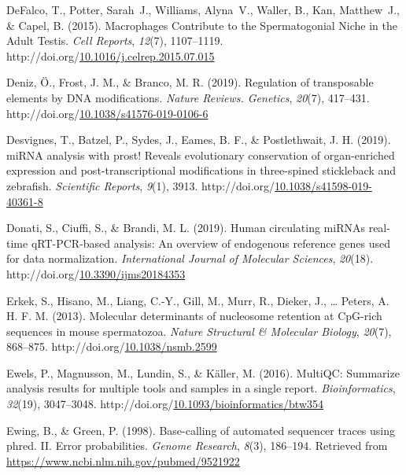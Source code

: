 \documentclass[12pt,twoside]{reedthesis}
\newlength{\cslhangindent}
\newenvironment{CSLReferences}[2] %
 {%
  \setlength{\parindent}{0pt}
  \ifodd #1 \everypar{\setlength{\hangindent}{\cslhangindent}}\ignorespaces\fi
  \ifnum #2 > 0
  \setlength{\parskip}{#2\baselineskip}
  \fi
 }%
 {}
\begin{document}
\begin{CSLReferences}{1}{0}
\leavevmode{}%
DeFalco, T., Potter, Sarah~J., Williams, Alyna~V., Waller, B., Kan, Matthew~J., \& Capel, B. (2015). Macrophages Contribute to the Spermatogonial Niche in the Adult Testis. \emph{Cell Reports}, \emph{12}(7), 1107--1119. http://doi.org/\href{https://doi.org/10.1016/j.celrep.2015.07.015}{10.1016/j.celrep.2015.07.015}

\leavevmode{}%
Deniz, Ö., Frost, J. M., \& Branco, M. R. (2019). Regulation of transposable elements by DNA modifications. \emph{Nature Reviews. Genetics}, \emph{20}(7), 417--431. http://doi.org/\href{https://doi.org/10.1038/s41576-019-0106-6}{10.1038/s41576-019-0106-6}

\leavevmode{}%
Desvignes, T., Batzel, P., Sydes, J., Eames, B. F., \& Postlethwait, J. H. (2019). miRNA analysis with prost! Reveals evolutionary conservation of organ-enriched expression and post-transcriptional modifications in three-spined stickleback and zebrafish. \emph{Scientific Reports}, \emph{9}(1), 3913. http://doi.org/\href{https://doi.org/10.1038/s41598-019-40361-8}{10.1038/s41598-019-40361-8}

\leavevmode{}%
Donati, S., Ciuffi, S., \& Brandi, M. L. (2019). Human circulating miRNAs real-time qRT-PCR-based analysis: An overview of endogenous reference genes used for data normalization. \emph{International Journal of Molecular Sciences}, \emph{20}(18). http://doi.org/\href{https://doi.org/10.3390/ijms20184353}{10.3390/ijms20184353}

\leavevmode{}%
Erkek, S., Hisano, M., Liang, C.-Y., Gill, M., Murr, R., Dieker, J., \ldots{} Peters, A. H. F. M. (2013). Molecular determinants of nucleosome retention at CpG-rich sequences in mouse spermatozoa. \emph{Nature Structural \& Molecular Biology}, \emph{20}(7), 868--875. http://doi.org/\href{https://doi.org/10.1038/nsmb.2599}{10.1038/nsmb.2599}

\leavevmode{}%
Ewels, P., Magnusson, M., Lundin, S., \& Käller, M. (2016). MultiQC: Summarize analysis results for multiple tools and samples in a single report. \emph{Bioinformatics}, \emph{32}(19), 3047--3048. http://doi.org/\href{https://doi.org/10.1093/bioinformatics/btw354}{10.1093/bioinformatics/btw354}

\leavevmode{}%
Ewing, B., \& Green, P. (1998). Base-calling of automated sequencer traces using phred. II. Error probabilities. \emph{Genome Research}, \emph{8}(3), 186--194. Retrieved from \url{https://www.ncbi.nlm.nih.gov/pubmed/9521922}


\end{CSLReferences}
\end{document}

